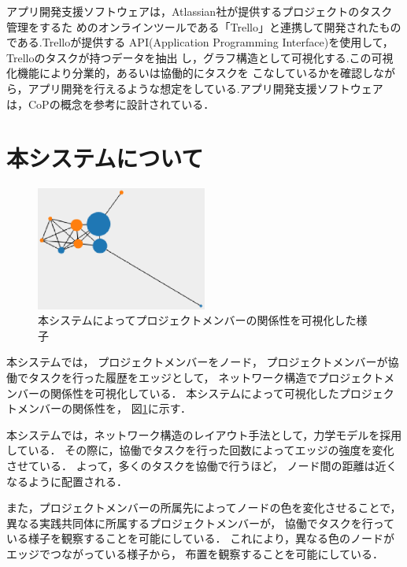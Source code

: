 \documentclass[submit,techrep]{ipsj}
\begin{document}
 アプリ開発支援ソフトウェアは，Atlassian社が提供するプロジェクトのタスク管理をするた めのオンラインツールである「Trello」\cite{trello}と連携して開発されたものである.Trelloが提供する API(Application Programming Interface)を使用して，Trelloのタスクが持つデータを抽出 し，グラフ構造として可視化する.この可視化機能により分業的，あるいは協働的にタスクを こなしているかを確認しながら，アプリ開発を行えるような想定をしている.アプリ開発支援ソフトウェアは，CoPの概念を参考に設計されている．




\section{本システムについて}
\label{system-map}

\begin{figure}[h]
  \centering
  \includegraphics[width=0.5\textwidth]{img/cop-map-graph.eps}
  \caption{本システムによってプロジェクトメンバーの関係性を可視化した様子}
  \label{cop-map-graph}
\end{figure}

本システムでは，
プロジェクトメンバーをノード，
プロジェクトメンバーが協働でタスクを行った履歴をエッジとして，
ネットワーク構造でプロジェクトメンバーの関係性を可視化している．
本システムによって可視化したプロジェクトメンバーの関係性を，
図\ref{cop-map-graph}に示す．

本システムでは，ネットワーク構造のレイアウト手法として，力学モデルを採用している．
その際に，協働でタスクを行った回数によってエッジの強度を変化させている．
よって，多くのタスクを協働で行うほど，
ノード間の距離は近くなるように配置される．

また，プロジェクトメンバーの所属先によってノードの色を変化させることで，
異なる実践共同体に所属するプロジェクトメンバーが，
協働でタスクを行っている様子を観察することを可能にしている．
これにより，異なる色のノードがエッジでつながっている様子から，
布置を観察することを可能にしている．
\end{document}
